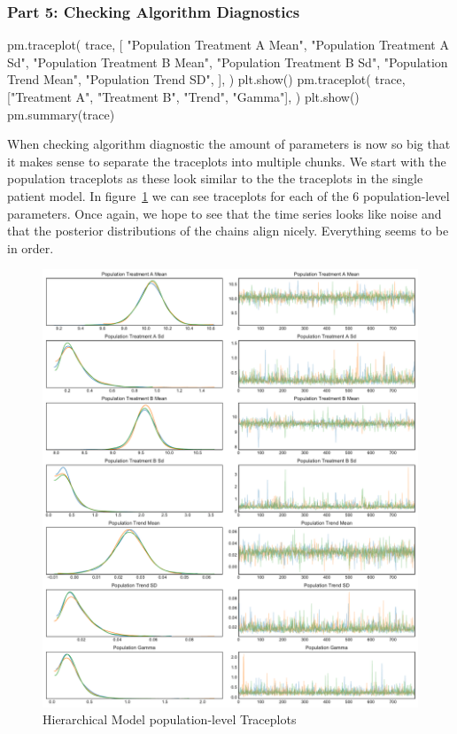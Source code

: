 \documentclass[12pt,a4paper,leqno]{report}
\theoremstyle{plain}
\theoremstyle{definition}
\theoremstyle{remark}
\begin{document}
\subsubsection*{Part 5: Checking Algorithm Diagnostics}

\bigskip
\begin{pyverbatim}[][fontsize=\footnotesize]
    pm.traceplot(
        trace,
        [
            "Population Treatment A Mean",
            "Population Treatment A Sd",
            "Population Treatment B Mean",
            "Population Treatment B Sd",
            "Population Trend Mean",
            "Population Trend SD",
        ],
    )
    plt.show()
    pm.traceplot(
        trace, ["Treatment A", "Treatment B", "Trend", "Gamma"],
    )
    plt.show()
    pm.summary(trace)
\end{pyverbatim}
\bigskip

When checking algorithm diagnostic the amount of parameters is now so big that it makes
sense to separate the traceplots into multiple chunks. We start with the population
traceplots as these look similar to the the traceplots in the single patient
model. In figure\ \ref{hierarchicalmodelpopulationtraceplots} we can see traceplots for each of
the 6 population-level parameters. Once again, we hope to see that the time series looks
like noise and that the posterior distributions of the chains align nicely. Everything
seems to be in order.

\bigskip
\begin{figure}[H]
    \caption{Hierarchical Model population-level Traceplots}\label{hierarchicalmodelpopulationtraceplots}
    \bigskip
    \includegraphics[width=\textwidth,height=\textheight,keepaspectratio]{hierarchical_model_population_level_traceplot.pdf}
\end{figure}
\bigskip
\end{document}
